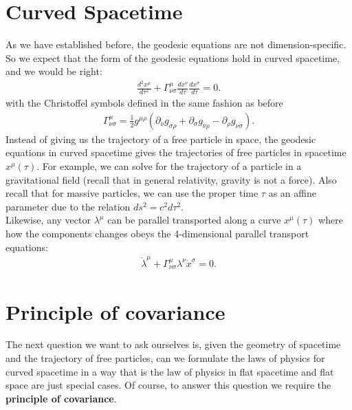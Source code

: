\documentclass{book}
\theoremstyle{definition}
\begin{document}
\section{Curved Spacetime}

As we have established before, the geodesic equations are not dimension-specific. So we expect that the form of the geodesic equations hold in curved spacetime, and we would be right:
\begin{align*}
\frac{d^2x^\mu}{d\tau^2} + \Gamma^{\mu}_{\nu\sigma}\frac{dx^\nu}{d\tau}\frac{dx^\sigma}{d\tau} = 0.
\end{align*}
with the Christoffel symbols defined in the same fashion as before
\begin{align*}
\Gamma^\mu_{\nu\sigma} = \frac{1}{2}g^{\mu\rho}\left(\partial_\nu g_{\sigma\rho} + \partial_{\sigma}g_{\nu\rho} - \partial_\rho g_{\nu\sigma} \right).
\end{align*}
Instead of giving us the trajectory of a free particle in space, the geodesic equations in curved spacetime gives the trajectories of free particles in spacetime $x^\mu(\tau)$. For example, we can solve for the trajectory of a particle in a gravitational field (recall that in general relativity, gravity is not a force). Also recall that for massive particles, we can use the proper time $\tau$ as an affine parameter due to the relation $ds^2 = c^2d\tau^2$.\\

Likewise, any vector $\lambda^\mu$ can be parallel transported along a curve $x^\mu(\tau)$ where how the components changes obeys the 4-dimensional parallel transport equations:
\begin{align*}
\dot{\lambda}^\mu + \Gamma^\mu_{\nu\sigma}\lambda^\nu \dot{x}^\sigma = 0.
\end{align*}

\section{Principle of covariance}
The next question we want to ask ourselves is, given the geometry of spacetime and the trajectory of free particles, can we formulate the laws of physics for curved spacetime in a way that is the law of physics in flat spacetime and flat space are just special cases. Of course, to answer this question we require the \textbf{principle of covariance}.\\
\end{document}

